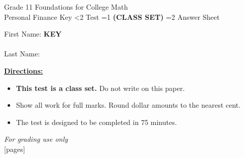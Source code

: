 \documentclass[addpoints]{exam}
\newcommand{\event}{Personal Finance}
\newcommand{\tournament}{}
\def\type{0}
\begin{document}
\begin{center}
    {\huge Grade 11 Foundations for College Math \\ \event
    \ifprintanswers \space Key
    \else \space \ifnum\type<2 Test \fi \ifnum\type=1 \textbf{(CLASS SET)} \fi
          \ifnum\type=2 Answer Sheet \fi
    \fi \\ \vspace{3mm}\tournament\vspace{1mm}}
\end{center}

\vspace{.25\textheight}

\begin{center}
    First Name: \ifprintanswers
    \underline{\hspace{3.5cm}}\textbf{KEY}\underline{\hspace{5.5cm}}\\\ \vspace{5mm}
    \else \underline{\hspace{10cm}}\\ \vspace{5mm} \fi
    Last Name: \underline{\hspace{10cm}}\\ \vspace{5mm}
\end{center}

\noindent\textbf{\underline{Directions:}}
\begin{itemize}
    \ifnum\type=1 \item \textbf{This test is a class set.} Do not write on this paper. \fi
    \item Show all work for full marks. Round dollar amounts to the nearest cent.
    \item The test is designed to be completed in 75 minutes.
\end{itemize}
\begin{center}
\textit{For grading use only}\\
[pages]
\end{center}
\end{document}
